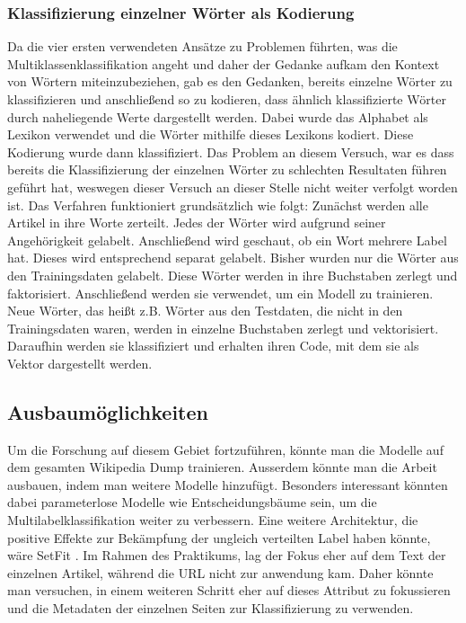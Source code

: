 \subsubsection{Klassifizierung einzelner Wörter als Kodierung}
Da die vier ersten verwendeten Ansätze zu Problemen führten, was die Multiklassenklassifikation angeht und daher der Gedanke aufkam den Kontext von Wörtern miteinzubeziehen, gab es den Gedanken, bereits einzelne Wörter zu klassifizieren und anschließend so zu kodieren, dass ähnlich klassifizierte Wörter durch naheliegende Werte dargestellt werden. Dabei wurde das Alphabet als Lexikon verwendet und die Wörter mithilfe dieses Lexikons kodiert. Diese Kodierung wurde dann klassifiziert. Das Problem an diesem Versuch, war es dass bereits die Klassifizierung der einzelnen Wörter zu schlechten Resultaten führen geführt hat, weswegen dieser Versuch an dieser Stelle nicht weiter verfolgt worden ist. Das Verfahren funktioniert grundsätzlich wie folgt: Zunächst werden alle Artikel in ihre Worte zerteilt. Jedes der Wörter wird aufgrund seiner Angehörigkeit gelabelt. Anschließend wird geschaut, ob ein Wort mehrere Label hat. Dieses wird entsprechend separat gelabelt. Bisher wurden nur die Wörter aus den Trainingsdaten gelabelt. Diese Wörter werden in ihre Buchstaben zerlegt und faktorisiert. Anschließend werden sie verwendet, um ein Modell zu trainieren. Neue Wörter, das heißt z.B. Wörter aus den Testdaten, die nicht in den Trainingsdaten waren, werden in einzelne Buchstaben zerlegt und vektorisiert. Daraufhin werden sie klassifiziert und erhalten ihren Code, mit dem sie als Vektor dargestellt werden.

\subsection{Ausbaumöglichkeiten}
Um die Forschung auf diesem Gebiet fortzuführen, könnte man die Modelle auf dem gesamten Wikipedia Dump trainieren. Ausserdem könnte man die Arbeit ausbauen, indem man weitere Modelle hinzufügt. Besonders interessant könnten dabei parameterlose Modelle wie Entscheidungsbäume sein, um die Multilabelklassifikation weiter zu verbessern. Eine weitere Architektur, die positive Effekte zur Bekämpfung der ungleich verteilten Label haben könnte, wäre SetFit \cite{Tunstall2022}. Im Rahmen des Praktikums, lag der Fokus eher auf dem Text der einzelnen Artikel, während die URL nicht zur anwendung kam. Daher könnte man versuchen, in einem weiteren Schritt eher auf dieses Attribut zu fokussieren und die Metadaten der einzelnen Seiten zur Klassifizierung zu verwenden.
